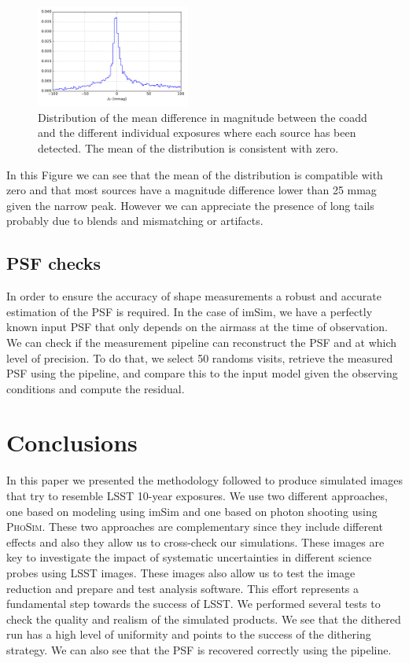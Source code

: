 \documentclass[\docopts]{\docclass}
\begin{document}
\begin{figure}
  \centering
  \includegraphics[width=0.45\textwidth]{photometry_internal_10visits_imsim_undithered}
  \caption{Distribution of the mean difference in magnitude between the coadd and the different individual exposures
  where each source has been detected. The mean of the distribution is consistent with zero.}
  \label{fig:internal_photometry_a}
\end{figure}

In this Figure we can see that the mean of the distribution is compatible with zero and that most sources have a magnitude difference lower
than 25 mmag given the narrow peak. However we can appreciate the presence of long tails probably due to blends and mismatching or artifacts.

\subsection{PSF checks}
\label{sec:psf_checks}

In order to ensure the accuracy of shape measurements a robust and accurate estimation of the PSF is required. In the case of imSim, we have
a perfectly known input PSF that only depends on the airmass at the time of observation. We can check if the measurement pipeline can reconstruct
the PSF and at which level of precision. To do that, we select 50 randoms visits, retrieve the measured PSF using the pipeline, and compare this
to the input model given the observing conditions and compute the residual.

\section{Conclusions}
\label{sec:conclusions}

In this paper we presented the methodology followed to produce simulated images that try to resemble LSST 10-year exposures. We use two different
approaches, one based on modeling using imSim and one based on photon shooting using \textsc{PhoSim}. These two approaches are complementary
since they include different effects and also they allow us to cross-check our simulations. These images are key to investigate
the impact of systematic uncertainties in different science probes using LSST images. These images also allow us to test the image reduction and
prepare and test analysis software. This effort represents a fundamental step towards the success of LSST. We performed several tests to check the
quality and realism of the simulated products. We see that the dithered run has a high level of uniformity and points to the success of the dithering
strategy. We can also see that the PSF is recovered correctly using the pipeline.
\end{document}

